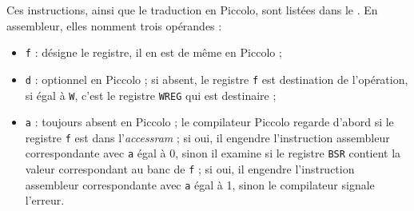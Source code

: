 
Ces instructions, ainsi que le traduction en Piccolo, sont listées dans le . En assembleur, elles nomment trois opérandes :
\begin{itemize}
  \item \texttt{f} : désigne le registre, il en est de même en Piccolo ;
  \item \texttt{d} : optionnel en Piccolo ; si absent, le registre \texttt{f} est destination de l'opération, si égal à \texttt{W}, c'est le registre \texttt{WREG} qui est destinaire ;
  \item \texttt{a} : toujours absent en Piccolo ; le compilateur Piccolo regarde d'abord si le registre \texttt{f} est dans l'\emph{accessram} ; si oui, il engendre l'instruction assembleur correspondante avec \texttt{a} égal à 0, sinon il examine si le registre \texttt{BSR} contient la valeur correspondant au banc de \texttt{f} ; si oui, il engendre l'instruction assembleur correspondante avec \texttt{a} égal à 1, sinon le compilateur signale l'erreur.
\end{itemize}


